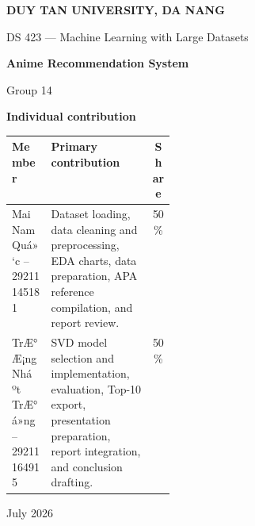 \documentclass[12pt,a4paper]{article}
\title{\projecttitle}
\author{Group 14}
\date{July 2026}
\newcommand{\projecttitle}{Anime Recommendation System}
\newcommand{\memberone}{Mai Nam Quá»‘c -- 29211145181}
\newcommand{\membertwo}{TrÆ°Æ¡ng Nháº­t TrÆ°á»ng -- 29211164915}
\let\memberonefull\memberone
\let\membertwofull\membertwo
\renewcommand{\memberone}{Quá»‘c}
\renewcommand{\membertwo}{TrÆ°á»ng}
\begin{document}
\begin{titlepage}
  \centering
  {\Large \textbf{DUY TAN UNIVERSITY, DA NANG}\par}
  \vspace{1.2cm}
  {\large DS 423 --- Machine Learning with Large Datasets\par}
  \vspace{2.0cm}
  {\LARGE \textbf{\projecttitle}\par}
  \vspace{1.4cm}
  {\large Group 14\par}
  \vspace{1.2cm}

  \vspace{0.9cm}
  {\large \textbf{Individual contribution}\par}
  \vspace{0.35cm}
  \small
  \begin{tabularx}{\linewidth}{p{0.24\linewidth}Yc}
    \toprule
    \textbf{Member} & \textbf{Primary contribution} & \textbf{Share} \\
    \midrule
    \memberonefull & Dataset loading, data cleaning and preprocessing, EDA charts, data preparation, APA reference compilation, and report review. & 50\% \\
    \membertwofull & SVD model selection and implementation, evaluation, Top-10 export, presentation preparation, report integration, and conclusion drafting. & 50\% \\
    \bottomrule
  \end{tabularx}
  \par
  \vspace{0.25cm}
  \par
  \vfill
  \vspace{0.8cm}
  {\large July 2026\par}
\end{titlepage}
\end{document}
